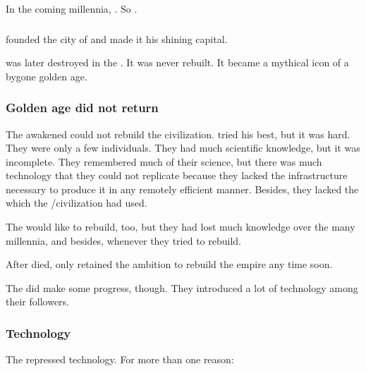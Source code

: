 In the coming millennia, . 
So . 





\subsubsection{\Sardathrion}
\index{\Sardathrion}
\Nexagglachel founded the city of \Sardathrion and made it his shining capital. 

\Sardathrion was later destroyed in the .
It was never rebuilt.
It became a mythical icon of a bygone golden age.





\subsubsection{Golden age did not return}
The awakened \dragons could not rebuild the \ophidian civilization. 
\Nexagglachel tried his best, but it was hard. 
They were only a few individuals.
They had much scientific knowledge, but it was incomplete.
They remembered much of their science, but there was much technology that they could not replicate because they lacked the infrastructure necessary to produce it in any remotely efficient manner. 
Besides, they lacked the  which the \ophidian/\draconian civilization had used. 

The \ophidians would like to rebuild, too, but they had lost much knowledge over the many millennia, and besides,  whenever they tried to rebuild.

After \Nexagglachel died, only \Secherdamon retained the ambition to rebuild the \ophidian empire any time soon. 

The \dragons did make some progress, though. 
They introduced a lot of technology among their followers.





\subsubsection{Technology}
The \dragons repressed technology. 
For more than one reason:

